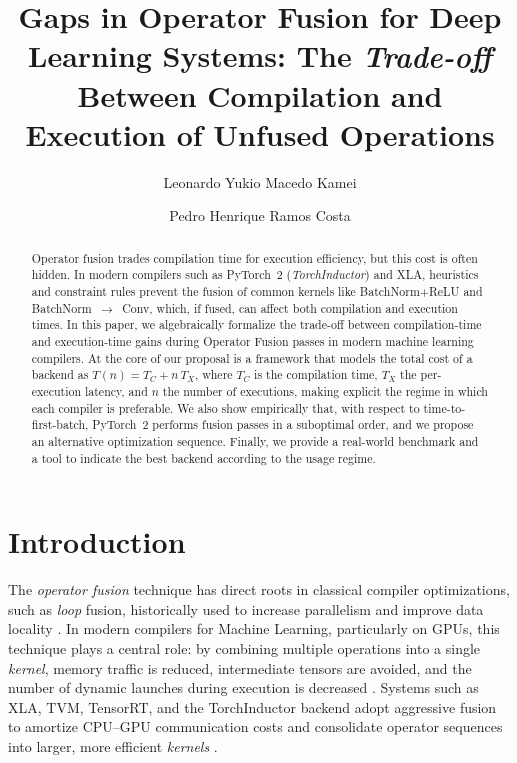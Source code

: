 \documentclass[sigconf,anonymous]{acmart}
\title{Gaps in Operator Fusion for Deep Learning Systems: The \textit{Trade-off} Between Compilation and Execution of Unfused Operations}
\author[L. Kamei]{Leonardo Yukio Macedo Kamei}
\affiliation{%
  \institution{PUC-MG}
  \city{Belo Horizonte}
  \country{Brazil}}
\author[P. Costa]{Pedro Henrique Ramos Costa}
\affiliation{%
  \institution{PUC-MG}
  \city{Belo Horizonte}
  \country{Brazil}}
\begin{document}
\begin{abstract}
Operator fusion trades compilation time for execution efficiency, but this cost is often hidden. In modern compilers such as PyTorch~2 (\textit{TorchInductor}) and XLA, heuristics and constraint rules prevent the fusion of common kernels like BatchNorm+ReLU and BatchNorm~$\rightarrow$~Conv, which, if fused, can affect both compilation and execution times. In this paper, we algebraically formalize the trade-off between compilation-time and execution-time gains during Operator Fusion passes in modern machine learning compilers. At the core of our proposal is a framework that models the total cost of a backend as $T(n)=T_C+n\,T_X$, where $T_C$ is the compilation time, $T_X$ the per-execution latency, and $n$ the number of executions, making explicit the regime in which each compiler is preferable. We also show empirically that, with respect to time-to-first-batch, PyTorch~2 performs fusion passes in a suboptimal order, and we propose an alternative optimization sequence. Finally, we provide a real-world benchmark and a tool to indicate the best backend according to the usage regime.
\end{abstract}


\maketitle


\section{Introduction}
The \emph{operator fusion} technique has direct roots in classical compiler optimizations, such as \emph{loop} fusion, historically used to increase parallelism and improve data locality \cite{wolf1991wolf}. In modern compilers for Machine Learning, particularly on GPUs, this technique plays a central role: by combining multiple operations into a single \emph{kernel}, memory traffic is reduced, intermediate tensors are avoided, and the number of dynamic launches during execution is decreased \cite{chen2018tvm,liu2021dnnfusion}. Systems such as XLA, TVM, TensorRT, and the TorchInductor backend adopt aggressive fusion to amortize CPU--GPU communication costs and consolidate operator sequences into larger, more efficient \emph{kernels} \cite{xla2017leary,chen2018tvm,pytorch2022}.
\end{document}
